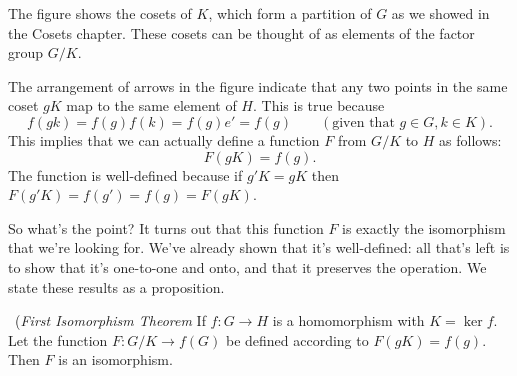 The figure shows the cosets of $K$, which form a partition of $G$ as we showed in the Cosets chapter. These cosets can be thought of as elements of the factor group $G/K$. 

The arrangement of arrows in the figure indicate that any two points in the same coset $gK$ map to the same element of $H$.  
This is true because
\[ f(gk) = f(g)f(k) = f(g)e' = f(g)\qquad (\text{given that } g \in G, k \in K).\]
This implies that we can actually define a function $F$ from $G/K$ to $H$ as follows:
\[ F(gK) = f(g). \]
The function is well-defined because if $g'K = gK$ then $F(g'K) = f(g') = f(g) = F(gK)$.
 
So what's the point? It turns out that this function $F$ is exactly the isomorphism that we're looking for. We've already shown that it's well-defined: all that's left is to show that it's one-to-one and onto, and that it preserves the operation. We state these results as a proposition.

%  
%
%
%
%
% 
 
 
\begin{thm}~(\emph{First Isomorphism Theorem}\label{FirstIsoTheorem} 
If $f : G \rightarrow H$ is a homomorphism with $K =\ker
f$. Let the function $F: G/K \rightarrow f(G)$
 be defined according to $F(gK) = f(g)$. Then $F$ is an isomorphism. 
\end{thm}
 
